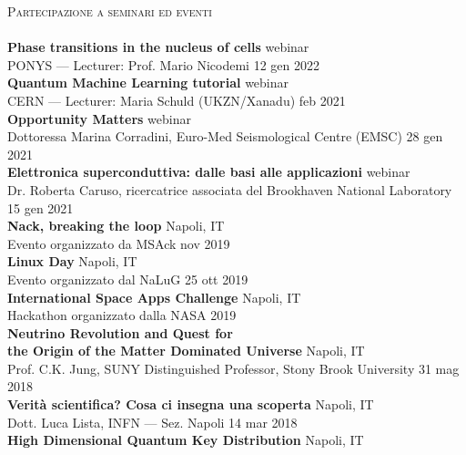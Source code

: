 \documentclass[a4paper]{article}
\newcommand{\lineunder} {
  \vspace*{-8pt} \\
  \hspace*{-18pt} \hrulefill \\
}
\newcommand{\header} [1] {
  {\hspace*{-18pt}\vspace*{6pt} \textsc{#1}}
  \vspace*{-6pt} \lineunder
}
\begin{document}
\header{Partecipazione a seminari ed eventi}
\textbf{Phase transitions in the nucleus of cells} \hfill webinar \\
PONYS --- Lecturer: Prof. Mario Nicodemi \hfill 12 gen 2022\\
\vspace*{2mm}
\textbf{Quantum Machine Learning tutorial} \hfill webinar\\
CERN --- Lecturer: Maria Schuld (UKZN/Xanadu) \hfill feb 2021\\
\vspace*{2mm}
\textbf{Opportunity Matters} \hfill webinar \\
Dottoressa Marina Corradini,
Euro-Med Seismological Centre (EMSC)
\hfill 28 gen 2021 \\
\vspace*{2mm}
\textbf{Elettronica superconduttiva: dalle basi alle applicazioni}
\hfill webinar \\
Dr. Roberta Caruso, ricercatrice associata del Brookhaven National Laboratory
\hfill 15 gen 2021 \\
\vspace*{2mm}
\textbf{Nack, breaking the loop} \hfill Napoli, IT \\
Evento organizzato da MSAck \hfill nov 2019 \\
\vspace*{2mm}
\textbf{Linux Day} \hfill Napoli, IT \\
Evento organizzato dal NaLuG \hfill 25 ott 2019 \\
\vspace*{2mm}
\textbf{International Space Apps Challenge} \hfill Napoli, IT\\
Hackathon organizzato dalla NASA
\hfill 2019\\
\vspace*{2mm}
\textbf{Neutrino Revolution and Quest for \\ the Origin of the Matter Dominated Universe} \hfill Napoli, IT \\
Prof. C.K. Jung, SUNY Distinguished Professor, Stony Brook University
\hfill 31 mag 2018 \\
\vspace*{2mm}
\textbf{Verità scientifica? Cosa ci insegna una scoperta}
\hfill Napoli, IT \\
Dott. Luca Lista, INFN --- Sez. Napoli
\hfill 14 mar 2018 \\
\vspace*{2mm}
\textbf{High Dimensional Quantum Key Distribution} \hfill Napoli, IT \\
\end{document}
